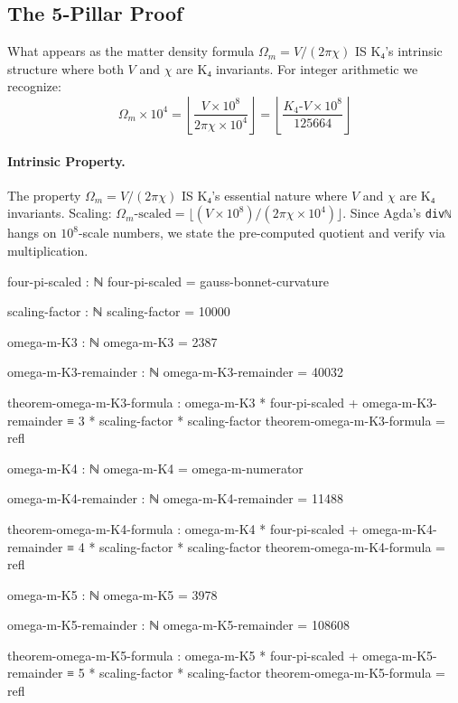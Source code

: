 \documentclass[11pt,a4paper]{book}
\begin{document}
\subsection{The 5-Pillar Proof}

What appears as the matter density formula $\Omega_m = V/(2\pi\chi)$ IS K₄'s intrinsic structure where both $V$ and $\chi$ are K₄ invariants. For integer arithmetic we recognize:
\[
  \Omega_m \times 10^4 = \left\lfloor \frac{V \times 10^8}{2\pi\chi \times 10^4} \right\rfloor 
  = \left\lfloor \frac{K_4\text{-}V \times 10^8}{125664} \right\rfloor
\]

\paragraph{Intrinsic Property.}
The property $\Omega_m = V / (2\pi\chi)$ IS K₄'s essential nature where $V$ and $\chi$ are K₄ invariants.
Scaling: $\Omega_m\text{-scaled} = \lfloor(V \times 10^8) / (2\pi\chi \times 10^4)\rfloor$.
Since Agda's \texttt{divℕ} hangs on $10^8$-scale numbers, we state the pre-computed quotient and verify via multiplication.

\begin{code}
four-pi-scaled : ℕ
four-pi-scaled = gauss-bonnet-curvature

scaling-factor : ℕ
scaling-factor = 10000

omega-m-K3 : ℕ
omega-m-K3 = 2387

omega-m-K3-remainder : ℕ
omega-m-K3-remainder = 40032

theorem-omega-m-K3-formula : omega-m-K3 * four-pi-scaled + omega-m-K3-remainder ≡ 3 * scaling-factor * scaling-factor
theorem-omega-m-K3-formula = refl

omega-m-K4 : ℕ
omega-m-K4 = omega-m-numerator

omega-m-K4-remainder : ℕ
omega-m-K4-remainder = 11488

theorem-omega-m-K4-formula : omega-m-K4 * four-pi-scaled + omega-m-K4-remainder ≡ 4 * scaling-factor * scaling-factor
theorem-omega-m-K4-formula = refl

omega-m-K5 : ℕ
omega-m-K5 = 3978

omega-m-K5-remainder : ℕ
omega-m-K5-remainder = 108608

theorem-omega-m-K5-formula : omega-m-K5 * four-pi-scaled + omega-m-K5-remainder ≡ 5 * scaling-factor * scaling-factor
theorem-omega-m-K5-formula = refl

\end{code}
\end{document}
